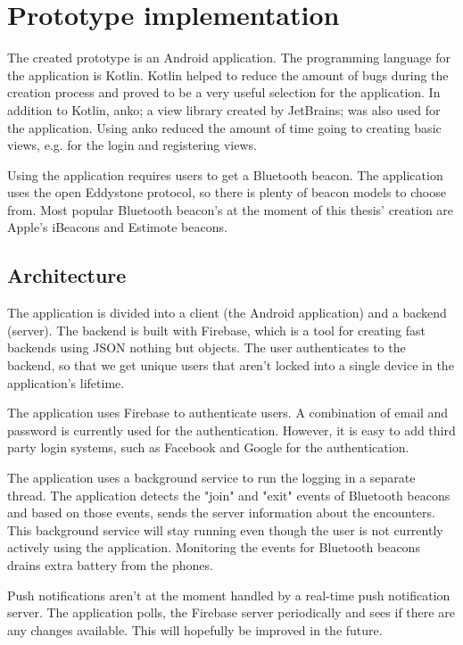 \section{Prototype implementation}

The created prototype is an Android application. The programming language for the application is Kotlin. Kotlin helped to reduce the amount of bugs during the creation process and proved to be a very useful selection for the application. In addition to Kotlin, anko; a view library created by JetBrains; was also used for the application. Using anko reduced the amount of time going to creating basic views, e.g. for the login and registering views.

Using the application requires users to get a Bluetooth beacon. The application uses the open  Eddystone protocol, so there is plenty of beacon models to choose from. Most popular Bluetooth beacon's at the moment of this thesis' creation are Apple's iBeacons and Estimote beacons.

\subsection{Architecture}

The application is divided into a client (the Android application) and a backend (server). The backend is built with Firebase, which is a tool for creating fast backends using JSON nothing but objects. The user authenticates to the backend, so that we get unique users that aren't locked into a single device in the application's lifetime.

The application uses Firebase to authenticate users. A combination of email and password is currently used for the authentication. However, it is easy to add third party login systems, such as Facebook and Google for the authentication.

The application uses a background service to run the logging in a separate thread. The application detects the "join" and "exit" events of Bluetooth beacons and based on those events, sends the server information about the encounters. This background service will stay running even though the user is not currently actively using the application. Monitoring the events for Bluetooth beacons drains extra battery from the phones.

Push notifications aren't at the moment handled by a real-time push notification server. The application polls, the Firebase server periodically and sees if there are any changes available. This will hopefully be improved in the future.

